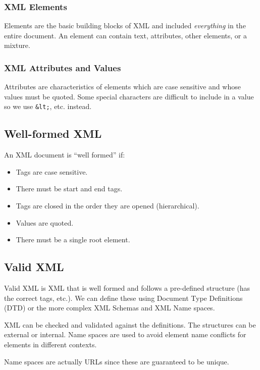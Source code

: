 \subsubsection{XML Elements}\label{ssub:xml_elements}

Elements are the basic building blocks of XML and included \emph{everything} in the entire document.
An element can contain text, attributes, other elements, or a mixture.

\subsubsection{XML Attributes and Values}\label{ssub:xml_attributes_and_values}

Attributes are characteristics of elements which are case sensitive and whose values must be quoted.
Some special characters are difficult to include in a value so we use \texttt{&lt;}, etc. instead.

\subsection{Well-formed XML}\label{sub:well_formed_xml}

An XML document is ``well formed'' if:
\begin{itemize}
	\item Tags are case sensitive.
	\item There must be start and end tags.
	\item Tags are closed in the order they are opened (hierarchical).
	\item Values are quoted.
	\item There must be a single root element.
\end{itemize}

\subsection{Valid XML}\label{sub:valid_xml}

Valid XML is XML that is well formed and follows a pre-defined structure (has the correct tags, etc.).
We can define these using Document Type Definitions (DTD) or the more complex XML Schemas and XML Name spaces.

XML can be checked and validated against the definitions.
The structures can be external or internal.
Name spaces are used to avoid element name conflicts for elements in different contexts.

\begin{note}
	Name spaces are actually URLs since these are guaranteed to be unique.
\end{note}

